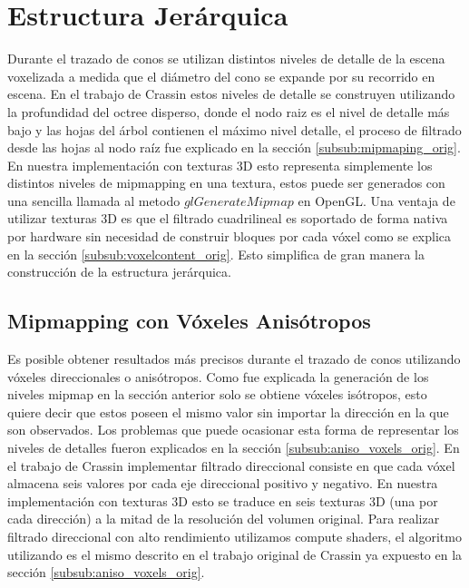 \section{Estructura Jerárquica} %
\label{sec:estructura_jerarquica}
Durante el trazado de conos se utilizan distintos niveles de detalle de la escena voxelizada a medida que el diámetro del cono se expande por su recorrido en escena. En el trabajo de Crassin estos niveles de detalle se construyen utilizando la profundidad del octree disperso, donde el nodo raiz es el nivel de detalle más bajo y las hojas del árbol contienen el máximo nivel detalle, el proceso de filtrado desde las hojas al nodo raíz fue explicado en la sección \ref{subsub:mipmaping_orig}. En nuestra implementación con texturas 3D esto representa simplemente los distintos niveles de mipmapping en una textura, estos puede ser generados con una sencilla llamada al metodo $glGenerateMipmap$ en OpenGL. Una ventaja de utilizar texturas 3D es que el filtrado cuadrilineal es soportado de forma nativa por hardware sin necesidad de construir bloques por cada vóxel como se explica en la sección \ref{subsub:voxelcontent_orig}. Esto simplifica de gran manera la construcción de la estructura jerárquica.

\subsection{Mipmapping con Vóxeles Anisótropos} %
\label{sub:mipmapping_direccioanl}
Es posible obtener resultados más precisos durante el trazado de conos utilizando vóxeles direccionales o anisótropos. Como fue explicada la generación de los niveles mipmap en la sección anterior solo se obtiene vóxeles isótropos, esto quiere decir que estos poseen el mismo valor sin importar la dirección en la que son observados. Los problemas que puede ocasionar esta forma de representar los niveles de detalles fueron explicados en la sección \ref{subsub:aniso_voxels_orig}. En el trabajo de Crassin implementar filtrado direccional consiste en que cada vóxel almacena seis valores por cada eje direccional positivo y negativo. En nuestra implementación con texturas 3D esto se traduce en seis texturas 3D (una por cada dirección) a la mitad de la resolución del volumen original. Para realizar filtrado direccional con alto rendimiento utilizamos compute shaders, el algoritmo utilizando es el mismo descrito en el trabajo original de Crassin ya expuesto en la sección \ref{subsub:aniso_voxels_orig}.
